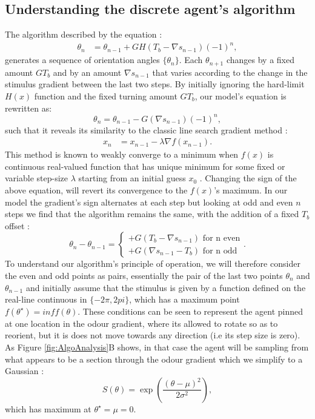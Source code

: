 \subsection{Understanding the discrete agent's algorithm}
\label{sec:AlgoExplain}
The algorithm described by the equation :
\begin{align}
\theta_n &= \theta_{n-1} + G H(T_b - \nabla s_{n-1}){(-1)}^n,
\label{eqn:DiscretemodelSupp}
\end{align}
 generates a sequence of orientation angles $\{\theta_n\}$. Each $\theta_{n+1}$ changes by a fixed amount $G T_b$ and by an amount $\nabla s_{n-1}$ that varies according to the change in the stimulus gradient between  the last two steps.
By initially ignoring the hard-limit $H(x)$ function  and the fixed turning amount $G T_b$, our model's equation is rewritten as:
\begin{equation}
 \theta_n = \theta_{n-1} - G (\nabla s_{n-1}){(-1)}^n,
\end{equation}
such that it reveals its similarity to the classic line search gradient method :
\begin{align}
x_n &= x_{n-1} - \lambda \nabla f(x_{n-1}).
\label{eqn:graddescent}
\end{align}
This method is known to weakly converge to a minimum when $f(x)$ is continuous real-valued function that has unique minimum for some fixed or variable step-size $\lambda$ starting from an initial guess $x_0$ \citep{armijo1966minimization}. Changing the sign of the above equation, will revert its convergence to the $f(x)$'s maximum. In our model the gradient's sign alternates at each step but looking at odd and even $n$ steps we find that the algorithm remains the same, with the addition of a fixed $T_b$ offset :
\begin{equation}
\theta_n - \theta_{n-1} = 
\begin{cases}
+G (T_b - \nabla s_{n-1}) \mbox { for n even}\\
+G (\nabla s_{n-1}-T_b) \mbox { for n odd}
\end{cases}.
\label{eq:oddevenPairs}
\end{equation}
 To understand our algorithm's principle of operation, we will therefore consider the even and odd points as pairs, essentially the pair of the last two points $\theta_n$ and $\theta_{n-1}$ and  initially assume that the stimulus is given by a function defined on the real-line continuous in $\{-2 \pi , 2 pi\}$, which has a maximum point $f(\theta^\star)=inf f(\theta)$.
  These conditions can be seen to represent the agent pinned at one location in the odour gradient, where its allowed to rotate so as to reorient, but it is does not move towards any direction (i.e its step size is zero). As Figure \ref{fig:AlgoAnalysis}B shows, in that case the agent will be sampling from what appears to be a section through the odour gradient which we simplify to a Gaussian :
\begin{equation}
S(\theta) = \exp\left({\frac{(\theta-\mu)^2}{2 \sigma^2}}\right),
\end{equation}
which has maximum at $\theta^\star = \mu =0$.


